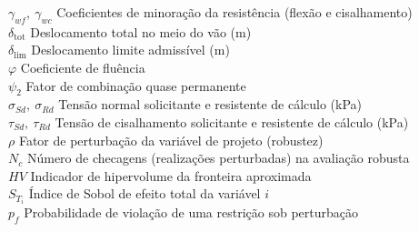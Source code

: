 \begin{tabbing}
$\gamma_{wf},\ \gamma_{wc}$ \> Coeficientes de minoração da resistência (flexão e cisalhamento)\\
$\delta_{\mathrm{tot}}$ \> Deslocamento total no meio do vão (m)\\
$\delta_{\mathrm{lim}}$ \> Deslocamento limite admissível (m)\\
$\varphi$ \> Coeficiente de fluência\\
$\psi_2$ \> Fator de combinação quase permanente\\
$\sigma_{Sd},\ \sigma_{Rd}$ \> Tensão normal solicitante e resistente de cálculo (kPa)\\
$\tau_{Sd},\ \tau_{Rd}$ \> Tensão de cisalhamento solicitante e resistente de cálculo (kPa)\\
$\rho$ \> Fator de perturbação da variável de projeto (robustez)\\
$N_c$ \> Número de checagens (realizações perturbadas) na avaliação robusta\\
$HV$ \> Indicador de hipervolume da fronteira aproximada\\
$S_{T_i}$ \> Índice de Sobol de efeito total da variável $i$\\
$p_f$ \> Probabilidade de violação de uma restrição sob perturbação
\end{tabbing}
